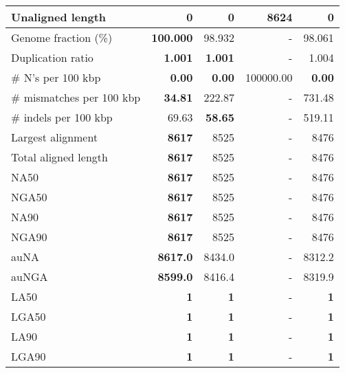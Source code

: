 \documentclass[12pt,a4paper]{article}
\begin{document}
\begin{table}[ht]
\begin{center}
\begin{tabular}{|l*{4}{|r}|}
Unaligned length & {\bf 0} & {\bf 0} & 8624 & {\bf 0} \\ \hline
Genome fraction (\%) & {\bf 100.000} & 98.932 & - & 98.061 \\ \hline
Duplication ratio & {\bf 1.001} & {\bf 1.001} & - & 1.004 \\ \hline
\# N's per 100 kbp & {\bf 0.00} & {\bf 0.00} & 100000.00 & {\bf 0.00} \\ \hline
\# mismatches per 100 kbp & {\bf 34.81} & 222.87 & - & 731.48 \\ \hline
\# indels per 100 kbp & 69.63 & {\bf 58.65} & - & 519.11 \\ \hline
Largest alignment & {\bf 8617} & 8525 & - & 8476 \\ \hline
Total aligned length & {\bf 8617} & 8525 & - & 8476 \\ \hline
NA50 & {\bf 8617} & 8525 & - & 8476 \\ \hline
NGA50 & {\bf 8617} & 8525 & - & 8476 \\ \hline
NA90 & {\bf 8617} & 8525 & - & 8476 \\ \hline
NGA90 & {\bf 8617} & 8525 & - & 8476 \\ \hline
auNA & {\bf 8617.0} & 8434.0 & - & 8312.2 \\ \hline
auNGA & {\bf 8599.0} & 8416.4 & - & 8319.9 \\ \hline
LA50 & {\bf 1} & {\bf 1} & - & {\bf 1} \\ \hline
LGA50 & {\bf 1} & {\bf 1} & - & {\bf 1} \\ \hline
LA90 & {\bf 1} & {\bf 1} & - & {\bf 1} \\ \hline
LGA90 & {\bf 1} & {\bf 1} & - & {\bf 1} \\ \hline
\end{tabular}
\end{center}
\end{table}
\end{document}
